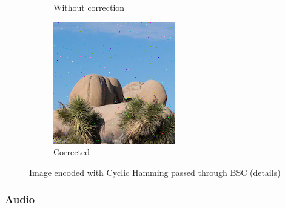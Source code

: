 \documentclass{article}
\begin{document}
\begin{figure}[htb]
\begin{subfigure}[b]{0.32\textwidth}
        \caption{Without correction}
        \label{fig:cropped-image-cyclic-bsc-no-correction}
    \end{subfigure}
    \hfill
    \begin{subfigure}[b]{0.32\textwidth}
        \centering
        \includegraphics[width=\textwidth]{../Result/Cyclic/15-11/cropped-cyclic-bsc-output-syndrome-corrected.png}
        \caption{Corrected}
        \label{fig:cropped-image-cyclic-bsc-syndrome-corrected}
    \end{subfigure}
       \caption{Image encoded with Cyclic Hamming passed through BSC (details)}
       \label{fig:cropped-image-cyclic-bsc}
\end{figure}






\subsubsection{Audio}
\end{document}
